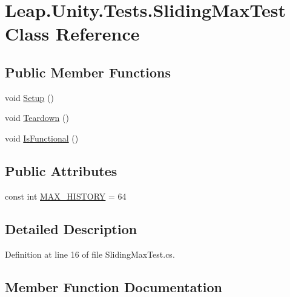 \hypertarget{class_leap_1_1_unity_1_1_tests_1_1_sliding_max_test}{}\section{Leap.\+Unity.\+Tests.\+Sliding\+Max\+Test Class Reference}
\label{class_leap_1_1_unity_1_1_tests_1_1_sliding_max_test}
\subsection*{Public Member Functions}
\begin{DoxyCompactItemize}
\item 
void \mbox{\hyperlink{class_leap_1_1_unity_1_1_tests_1_1_sliding_max_test_a060541dd6a108d4af8f2e15fb42e394b}{Setup}} ()
\item 
void \mbox{\hyperlink{class_leap_1_1_unity_1_1_tests_1_1_sliding_max_test_a129fcc36c99499c4b33a2706da21f501}{Teardown}} ()
\item 
void \mbox{\hyperlink{class_leap_1_1_unity_1_1_tests_1_1_sliding_max_test_a648bb7948915d2a8b4b6429fd21c57fb}{Is\+Functional}} ()
\end{DoxyCompactItemize}
\subsection*{Public Attributes}
\begin{DoxyCompactItemize}
\item 
const int \mbox{\hyperlink{class_leap_1_1_unity_1_1_tests_1_1_sliding_max_test_a177bf4349b2bd7c7b56b859203dd6411}{M\+A\+X\+\_\+\+H\+I\+S\+T\+O\+RY}} = 64
\end{DoxyCompactItemize}


\subsection{Detailed Description}


Definition at line 16 of file Sliding\+Max\+Test.\+cs.



\subsection{Member Function Documentation}
\mbox{\label{class_leap_1_1_unity_1_1_tests_1_1_sliding_max_test_a648bb7948915d2a8b4b6429fd21c57fb}} 
